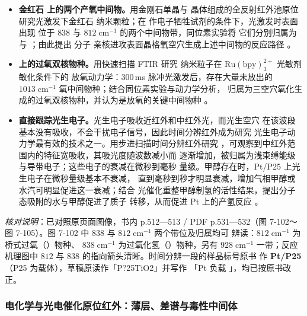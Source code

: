 \begin{itemize}
  \item \textbf{金红石  上的两个产氧中间物。}用金刚石单晶与
         晶体组成的全反射红外池原位研究光激发下金红石 
        纳米颗粒；在  作电子牺牲试剂的条件下，光激发时表面出现
        位于 $838$ 与 $812\;\mathrm{cm^{-1}}$ 的两个中间物带，同位素实验将
        它们分别归属为  与 ；由此提出  分子
        亲核进攻表面晶格氧空穴生成上述中间物的反应路径
        。
  \item \textbf{ 上的过氧双核物种。}用快速扫描 FTIR 研究
         纳米粒子在 $\mathrm{Ru(bpy)_3^{2+}}$ 光敏剂敏化条件下的
        放氧动力学：$300$\,ms 脉冲光激发后，存在大量未放出的
        $1013\;\mathrm{cm^{-1}}$ 氧中间物种；结合同位素实验与动力学分析，
        归属为三空穴氧化生成的过氧双核物种，并认为是放氧的关键中间物种
        。
  \item \textbf{直接跟踪光生电子。}光生电子吸收近红外和中红外光，而光生空穴
        在该波段基本没有吸收，不会干扰电子信号，因此时间分辨红外成为研究
        光生电子动力学最有效的技术之一。用步进扫描时间分辨红外研究
        ，可观察到中红外范围内的特征宽吸收，其吸光度随波数减小而
        逐渐增加，被归属为浅束缚能级与导带电子；这些电子的衰减在微秒到毫秒
        量级。甲醇存在时，Pt/P25  上光生电子在微秒量级基本不衰减，
        直到毫秒到秒才明显衰减，增加气相甲醇或水汽可明显促进这一衰减；结合
        光催化重整甲醇制氢的活性结果，提出分子态吸附的水与甲醇促进了质子
        转移，从而促进 Pt 上的产氢反应
        。
\end{itemize}

\emph{核对说明}：已对照原页面图像，书内 p.512—513 / PDF p.531—532（图 7-102～
图 7-105）。图 7-102 中 $838$ 与 $812\;\mathrm{cm^{-1}}$ 两个带位及归属均可
辨读：$812\;\mathrm{cm^{-1}}$ 为桥式过氧（）物种、
$838\;\mathrm{cm^{-1}}$ 为过氧化氢（）物种，另有 $928\;\mathrm{cm^{-1}}$
一带；反应机理图中 $812$ 与 $838$ 的指向箭头清晰。时间分辨一段的样品标号原书
作 \textbf{Pt/P25 }（P25 为载体），草稿原读作「P?25TiO2」并写作
「Pt 负载 」，均已按原书改正。

\subsubsection{电化学与光电催化原位红外：薄层、差谱与毒性中间体}

